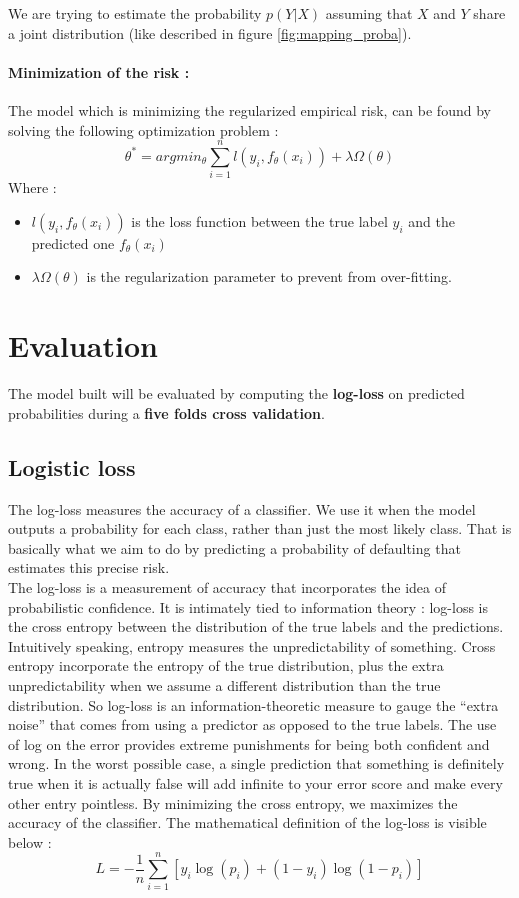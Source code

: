 	We are trying to estimate the probability $p(Y|X)$ assuming that $X$ and $Y$ share a joint distribution (like described in figure \ref{fig:mapping_proba}).

\newpage

\paragraph{Minimization of the risk :}
	The model which is minimizing the regularized empirical risk, can be found by solving the following optimization problem :
	$$\theta^*=argmin_\theta\sum_{i=1}^n l(y_i,f_\theta(x_i)) + \lambda\Omega(\theta)$$
	Where :
	\begin{itemize}[font=\footnotesize]
		\item $l(y_i,f_\theta(x_i))$ is the loss function between the true label $y_i$ and the predicted one $f_\theta(x_i)$
		\item $\lambda\Omega(\theta)$ is the regularization parameter to prevent from over-fitting.
	\end{itemize}

\section{Evaluation}
	The model built will be evaluated by computing the \textbf{log-loss} on predicted probabilities during a \textbf{five folds cross validation}.

	\subsection{Logistic loss}
		The log-loss measures the accuracy of a classifier. We use it when the model outputs a probability for each class, rather than just the most likely class. That is basically what we aim to do by predicting a probability of defaulting that estimates this precise risk.\\

		The log-loss is a measurement of accuracy that incorporates the idea of probabilistic confidence. It is intimately tied to information theory : log-loss is the cross entropy between the distribution of the true labels and the predictions. Intuitively speaking, entropy measures the unpredictability of something. Cross entropy incorporate the entropy of the true distribution, plus the extra unpredictability when we assume a different distribution than the true distribution. So log-loss is an information-theoretic measure to gauge the ``extra noise'' that comes from using a predictor as opposed to the true labels. The use of log on the error provides extreme punishments for being both confident and wrong. In the worst possible case, a single prediction that something is definitely true when it is actually false will add infinite to your error score and make every other entry pointless. By minimizing the cross entropy, we maximizes the accuracy of the classifier. The mathematical definition of the log-loss is visible below :
		$$L = -\frac{1}{n}\sum_{i=1}^{n}[y_i\log(p_i)+(1-y_i)\log(1-p_i)]$$

